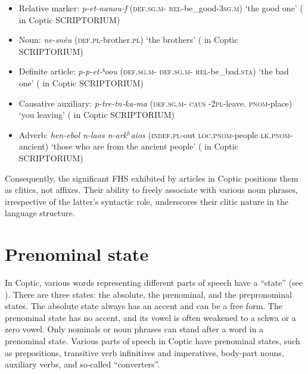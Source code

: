 \documentclass[output=paper,colorlinks,citecolor=brown ,chinesefont]{langscibook}
\begin{document}
\begin{itemize}
    \item Relative marker:  \textit{p-et-nanou-f} (\textsc{def}.\textsc{sg}.\textsc{m}- \textsc{rel}-be{\_}good-3\textsc{sg}.\textsc{m}) ‘the good one' ( in Coptic SCRIPTORIUM)
    \item Noun:  \textit{ne-snêu} (\textsc{def}.\textsc{pl}-brother.\textsc{pl}) ‘the brothers' ( in Coptic SCRIPTORIUM)
    \item Definite article:  \textit{p-p-et-ʰoou} (\textsc{def}.\textsc{sg}.\textsc{m}- \textsc{def}.\textsc{sg}.\textsc{m}- \textsc{rel}-be{\_}bad.\textsc{sta}) ‘the bad one' ( in Coptic SCRIPTORIUM)
    \item Causative auxiliary:  \textit{p-tre-tn-ka-ma} (\textsc{def}.\textsc{sg}.\textsc{m}- \textsc{caus} -2\textsc{pl}-leave. \textsc{pnom}-place) ‘you leaving' ( in Coptic SCRIPTORIUM)
    \item Adverb:  \textit{hen-ebol n-laos n-ark$^h$aios} (\textsc{indef}.\textsc{pl}-out \textsc{loc}.\textsc{pnom}-people \textsc{lk}.\textsc{pnom}-ancient) ‘those who are from the ancient people' ( in Coptic SCRIPTORIUM)
\end{itemize}

Consequently, the significant FHS exhibited by articles in Coptic positions them as clitics, not affixes. Their ability to freely associate with various noun phrases, irrespective of the latter's syntactic role, underscores their clitic nature in the language structure.


\section{Prenominal state}

In Coptic, various words representing different parts of speech have a “state” (see ).  There are three states: the absolute, the prenominal, and the prepronominal states. The absolute state always has an accent and can be a free form. The prenominal state has no accent, and its vowel is often weakened to a schwa or a zero vowel. Only nominals or noun phrases can stand after a word in a prenominal state. Various parts of speech in Coptic have prenominal states, such as prepositions, transitive verb infinitives and imperatives, body-part nouns, auxiliary verbs, and so-called “converters”.
\end{document}
